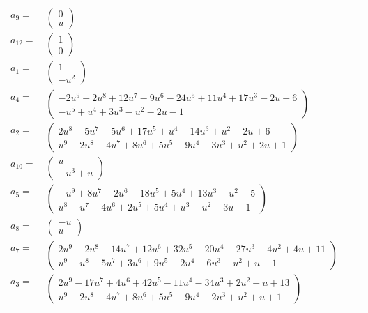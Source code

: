 \documentclass[1p]{elsarticle_modified}
\theoremstyle{definition}
\begin{document}
\begin{tabular}{m{7pt} m{180pt} m{7pt} m{180pt} }
\flushright $a_{9}=$&$\begin{pmatrix}0\\u\end{pmatrix}$ \\
\flushright $a_{12}=$&$\begin{pmatrix}1\\0\end{pmatrix}$ \\
\flushright $a_{1}=$&$\begin{pmatrix}1\\- u^2\end{pmatrix}$ \\
\flushright $a_{4}=$&$\begin{pmatrix}-2 u^9+2 u^8+12 u^7-9 u^6-24 u^5+11 u^4+17 u^3-2 u-6\\- u^5+u^4+3 u^3- u^2-2 u-1\end{pmatrix}$ \\
\flushright $a_{2}=$&$\begin{pmatrix}2 u^8-5 u^7-5 u^6+17 u^5+u^4-14 u^3+u^2-2 u+6\\u^9-2 u^8-4 u^7+8 u^6+5 u^5-9 u^4-3 u^3+u^2+2 u+1\end{pmatrix}$ \\
\flushright $a_{10}=$&$\begin{pmatrix}u\\- u^3+u\end{pmatrix}$ \\
\flushright $a_{5}=$&$\begin{pmatrix}- u^9+8 u^7-2 u^6-18 u^5+5 u^4+13 u^3- u^2-5\\u^8- u^7-4 u^6+2 u^5+5 u^4+u^3- u^2-3 u-1\end{pmatrix}$ \\
\flushright $a_{8}=$&$\begin{pmatrix}- u\\u\end{pmatrix}$ \\
\flushright $a_{7}=$&$\begin{pmatrix}2 u^9-2 u^8-14 u^7+12 u^6+32 u^5-20 u^4-27 u^3+4 u^2+4 u+11\\u^9- u^8-5 u^7+3 u^6+9 u^5-2 u^4-6 u^3- u^2+u+1\end{pmatrix}$ \\
\flushright $a_{3}=$&$\begin{pmatrix}2 u^9-17 u^7+4 u^6+42 u^5-11 u^4-34 u^3+2 u^2+u+13\\u^9-2 u^8-4 u^7+8 u^6+5 u^5-9 u^4-2 u^3+u^2+u+1\end{pmatrix}$ \\

\end{tabular}
\end{document}
